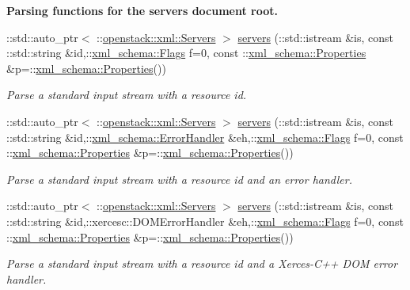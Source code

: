 \begin{Indent}{\bf Parsing functions for the servers document root.}
\begin{DoxyCompactItemize}
::std::auto\_\-ptr$<$ ::\hyperlink{classopenstack_1_1xml_1_1Servers}{openstack::xml::Servers} $>$ \hyperlink{namespaceopenstack_1_1xml_a0da83b51b0ff0a1bd33a636d2528d978}{servers} (::std::istream \&is, const ::std::string \&id,::\hyperlink{namespacexml__schema_affb4c227cbd9aa7453dd1dc5a1401943}{xml\_\-schema::Flags} f=0, const ::\hyperlink{namespacexml__schema_ad27ce19a7ee1d3b1064092648898f64c}{xml\_\-schema::Properties} \&p=::\hyperlink{namespacexml__schema_ad27ce19a7ee1d3b1064092648898f64c}{xml\_\-schema::Properties}())
\begin{DoxyCompactList}\small\item\em Parse a standard input stream with a resource id. \item\end{DoxyCompactList}\item 
::std::auto\_\-ptr$<$ ::\hyperlink{classopenstack_1_1xml_1_1Servers}{openstack::xml::Servers} $>$ \hyperlink{namespaceopenstack_1_1xml_a823b920d4401aa91dafe494e736b6f9b}{servers} (::std::istream \&is, const ::std::string \&id,::\hyperlink{namespacexml__schema_ab1c9361bfd3b404eaabf0c31eded79dc}{xml\_\-schema::ErrorHandler} \&eh,::\hyperlink{namespacexml__schema_affb4c227cbd9aa7453dd1dc5a1401943}{xml\_\-schema::Flags} f=0, const ::\hyperlink{namespacexml__schema_ad27ce19a7ee1d3b1064092648898f64c}{xml\_\-schema::Properties} \&p=::\hyperlink{namespacexml__schema_ad27ce19a7ee1d3b1064092648898f64c}{xml\_\-schema::Properties}())
\begin{DoxyCompactList}\small\item\em Parse a standard input stream with a resource id and an error handler. \item\end{DoxyCompactList}\item 
::std::auto\_\-ptr$<$ ::\hyperlink{classopenstack_1_1xml_1_1Servers}{openstack::xml::Servers} $>$ \hyperlink{namespaceopenstack_1_1xml_a53671bb73cbb0a435cfe9bbf777557a6}{servers} (::std::istream \&is, const ::std::string \&id,::xercesc::DOMErrorHandler \&eh,::\hyperlink{namespacexml__schema_affb4c227cbd9aa7453dd1dc5a1401943}{xml\_\-schema::Flags} f=0, const ::\hyperlink{namespacexml__schema_ad27ce19a7ee1d3b1064092648898f64c}{xml\_\-schema::Properties} \&p=::\hyperlink{namespacexml__schema_ad27ce19a7ee1d3b1064092648898f64c}{xml\_\-schema::Properties}())
\begin{DoxyCompactList}\small\item\em Parse a standard input stream with a resource id and a Xerces-\/C++ DOM error handler. \item\end{DoxyCompactList}\item 

\end{DoxyCompactItemize}
\end{Indent}
